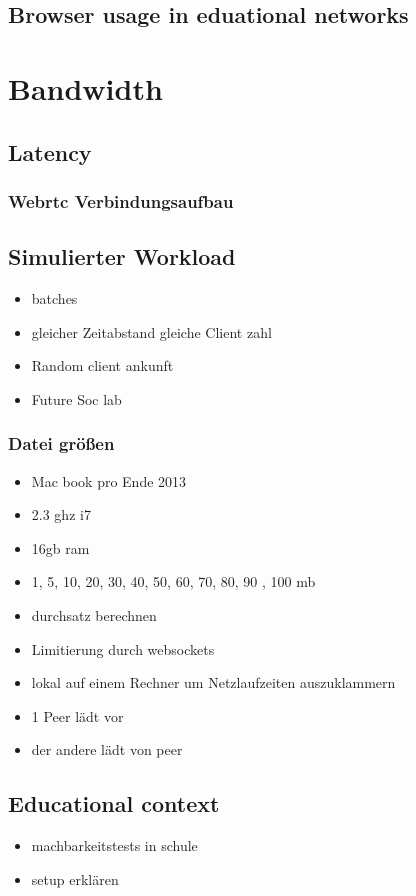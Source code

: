 \subsection{Browser usage in eduational networks}

\section{Bandwidth}

\subsection{Latency}

\subsubsection{Webrtc Verbindungsaufbau}

\subsection{Simulierter Workload}
\begin{itemize}
	\item batches
	\item gleicher Zeitabstand gleiche Client zahl
	\item Random client ankunft
	\item Future Soc lab
\end{itemize}

\subsubsection{Datei größen}
\begin{itemize}
	\item Mac book pro Ende 2013
	\item 2.3 ghz i7
	\item 16gb ram
	\item 1, 5, 10, 20, 30, 40, 50, 60, 70, 80, 90 , 100 mb
	\item durchsatz berechnen
	\item Limitierung durch websockets
	\item lokal auf einem Rechner um Netzlaufzeiten auszuklammern
	\item 1 Peer lädt vor
	\item der andere lädt von peer
\end{itemize}
\subsection{Educational context}
\begin{itemize}
	\item machbarkeitstests in schule
	\item setup erklären
	
\end{itemize}

